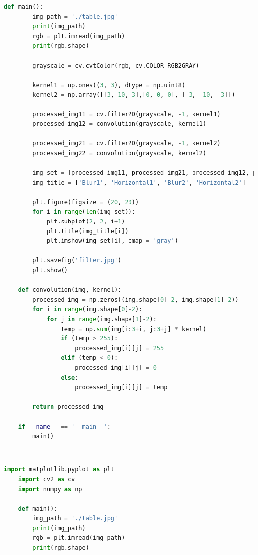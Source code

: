 \documentclass{article}
\begin{document}
{\begin{lstlisting}[language=Python, caption=Code for implementing filtering function and compare it with built-in function]
    def main():
        img_path = './table.jpg'
        print(img_path)
        rgb = plt.imread(img_path)
        print(rgb.shape)
    
        grayscale = cv.cvtColor(rgb, cv.COLOR_RGB2GRAY)
    
        kernel1 = np.ones((3, 3), dtype = np.uint8)
        kernel2 = np.array([[3, 10, 3],[0, 0, 0], [-3, -10, -3]])
    
        processed_img11 = cv.filter2D(grayscale, -1, kernel1)
        processed_img12 = convolution(grayscale, kernel1)
    
        processed_img21 = cv.filter2D(grayscale, -1, kernel2)
        processed_img22 = convolution(grayscale, kernel2)
    
        img_set = [processed_img11, processed_img21, processed_img12, processed_img22]
        img_title = ['Blur1', 'Horizontal1', 'Blur2', 'Horizontal2']
    
        plt.figure(figsize = (20, 20))
        for i in range(len(img_set)):
            plt.subplot(2, 2, i+1)
            plt.title(img_title[i])
            plt.imshow(img_set[i], cmap = 'gray')
    
        plt.savefig('filter.jpg')
        plt.show()
    
    def convolution(img, kernel):
        processed_img = np.zeros((img.shape[0]-2, img.shape[1]-2))
        for i in range(img.shape[0]-2):
            for j in range(img.shape[1]-2):
                temp = np.sum(img[i:3+i, j:3+j] * kernel)
                if (temp > 255):
                    processed_img[i][j] = 255
                elif (temp < 0):
                    processed_img[i][j] = 0
                else: 
                    processed_img[i][j] = temp
        
        return processed_img
    
    if __name__ == '__main__':
        main()

    \end{lstlisting}
    \\
    \lstset{style=mystyle}
    \begin{lstlisting}[language=Python, caption=Code for implementing histogram function and compare it with built-in function]
    import matplotlib.pyplot as plt
    import cv2 as cv
    import numpy as np
            
    def main():
        img_path = './table.jpg'
        print(img_path)
        rgb = plt.imread(img_path)
        print(rgb.shape)
    

\end{lstlisting}}
\end{document}
